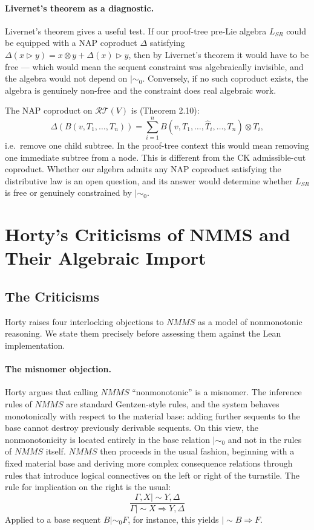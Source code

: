 \documentclass[a4paper,11pt]{report}
\newcommand{\ms}{\mathrel{\mid\!\sim}}
\newcommand{\mszero}{\mathrel{\mid\!\sim_{0}}}
\begin{document}
\paragraph{Livernet's theorem as a diagnostic.}
Livernet's theorem gives a useful test. If our proof-tree pre-Lie algebra $L_{SR}$ could
be equipped with a NAP coproduct $\Delta$ satisfying
$\Delta(x \triangleright y) = x \otimes y + \Delta(x) \triangleright y$, then by Livernet's
theorem it would have to be free --- which would mean the sequent constraint was
algebraically invisible, and the algebra would not depend on $\mszero$. Conversely, if no
such coproduct exists, the algebra is genuinely non-free and the constraint does real
algebraic work.

The NAP coproduct on $\mathcal{RT}(V)$ is (Theorem 2.10):
\[
  \Delta(B(v, T_1, \ldots, T_n)) = \sum_{i=1}^n B(v, T_1, \ldots, \hat{T}_i, \ldots, T_n) \otimes T_i,
\]
i.e.\ remove one child subtree. In the proof-tree context this would mean removing one
immediate subtree from a node. This is different from the CK admissible-cut coproduct.
Whether our algebra admits any NAP coproduct satisfying the distributive law is an open
question, and its answer would determine whether $L_{SR}$ is free or genuinely constrained
by $\mszero$.


\section*{Horty's Criticisms of NMMS and Their Algebraic Import}

\subsection*{The Criticisms}

Horty raises four interlocking objections to $\mathit{NMMS}$ as a model of nonmonotonic
reasoning. We state them precisely before assessing them against the Lean implementation.

\paragraph{The misnomer objection.}
Horty argues that calling $\mathit{NMMS}$ ``nonmonotonic'' is a misnomer.
The inference rules of $\mathit{NMMS}$ are standard Gentzen-style rules, and the system
behaves monotonically with respect to the material base: adding further sequents to the base
cannot destroy previously derivable sequents. On this view, the nonmonotonicity is located
entirely in the base relation $\mszero$ and not in the rules of $\mathit{NMMS}$ itself.
$\mathit{NMMS}$ then proceeds in the usual fashion, beginning with a fixed material base and
deriving more complex consequence relations through rules that introduce logical connectives
on the left or right of the turnstile. The rule for implication on the right is the usual:
\[
  \frac{\Gamma, X \ms Y, \Delta}{\Gamma \ms X \Rightarrow Y, \Delta}
\]
Applied to a base sequent $B \mszero F$, for instance, this yields $\ms B \Rightarrow F$.
\end{document}
